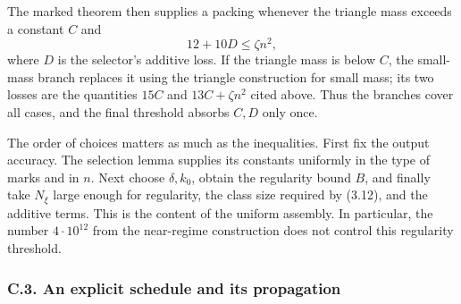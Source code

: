 \documentclass[english,11pt,a4paper]{article}
\begin{document}
The marked theorem then supplies a packing whenever the triangle mass exceeds a constant \(C\) and \[
12+10D\le\zeta n^2,
\tag{3.14}
\] where \(D\) is the selector's additive loss. If the triangle mass is below \(C\), the small-mass branch replaces it using the triangle construction for small mass; its two losses are the quantities \(15C\) and \(13C+\zeta n^2\) cited above. Thus the branches cover all cases, and the final threshold absorbs \(C,D\) only once.

The order of choices matters as much as the inequalities. First fix the output accuracy. The selection lemma supplies its constants uniformly in the type of marks and in \(n\). Next choose \(\delta,k_0\), obtain the regularity bound \(B\), and finally take \(N_\xi\) large enough for regularity, the class size required by (3.12), and the additive terms. This is the content of the uniform assembly. In particular, the number \(4\cdot10^{12}\) from the near-regime construction does not control this regularity threshold.

\subsubsection{C.3. An explicit schedule and its propagation}\label{c.3.-an-explicit-schedule-and-its-propagation}
\end{document}
